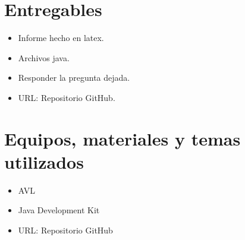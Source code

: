 \documentclass{article}
\begin{document}
 
  \section{Entregables}
  \begin{itemize}
    \item Informe hecho en latex.
    \item Archivos java.
    \item Responder la pregunta dejada.
    \item URL: Repositorio GitHub.
  \end{itemize}
  
		
	\section{Equipos, materiales y temas utilizados}
  \begin{itemize}
    \item AVL 
    \item Java Development Kit
    \item URL: Repositorio GitHub
  \end{itemize}
  
\end{document}
